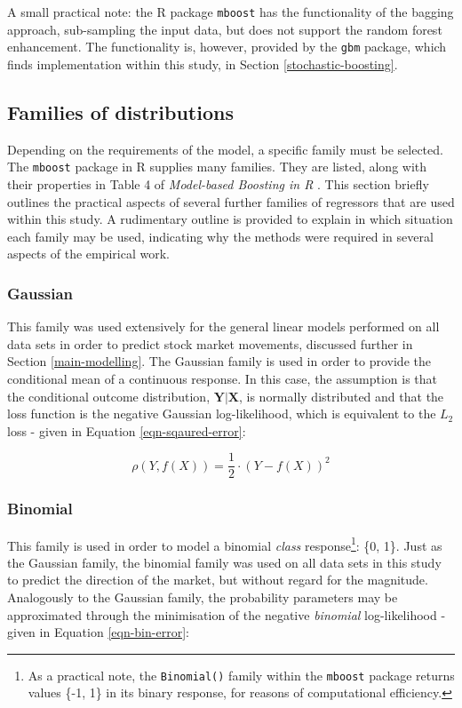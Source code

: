 \documentclass{article}
\begin{document}
A small practical note: the R package \texttt{mboost} has the functionality of the bagging approach, sub-sampling the input data, but does not support the random forest enhancement. The functionality is, however, provided by the \texttt{gbm} package, which finds implementation within this study, in Section \ref{stochastic-boosting}.


\subsection{Families of distributions}
\label{sec-5-6}

Depending on the requirements of the model, a specific family must be selected. The \texttt{mboost} package in R supplies many families. They are listed, along with their properties in Table 4 of \emph{Model-based Boosting in R} \cite{Hofner2012}. This section briefly outlines the practical aspects of several further families of regressors that are used within this study. A rudimentary outline is provided to explain in which situation each family may be used, indicating why the methods were required in several aspects of the empirical work.


\subsubsection{Gaussian}
\label{sec-5-6-1}

This family was used extensively for the general linear models performed on all data sets in order to predict stock market movements, discussed further in Section \ref{main-modelling}. The Gaussian family is used in order to provide the conditional mean of a continuous response. In this case, the assumption is that the conditional outcome distribution, $\mathbf{Y}|\mathbf{X}$, is normally distributed and that the loss function is the negative Gaussian log-likelihood, which is equivalent to the $L_2$ loss - given in Equation \eqref{eqn-sqaured-error}:

\begin{equation}
  \rho (Y, f(X)) = \frac{1}{2} \cdot (Y - f(X))^2
  \label{eqn-sqaured-error}
\end{equation}


\subsubsection{Binomial}
\label{sec-5-6-2}

This family is used in order to model a binomial \emph{class} response\footnote{As a practical note, the \texttt{Binomial()} family within the \texttt{mboost} package returns values \{-1, 1\} in its binary response, for reasons of computational efficiency.}: \{0, 1\}. Just as the Gaussian family, the binomial family was used on all data sets in this study to predict the direction of the market, but without regard for the magnitude. Analogously to the Gaussian family, the probability parameters may be approximated through the minimisation of the negative \emph{binomial} log-likelihood - given in Equation \eqref{eqn-bin-error}:
\end{document}
